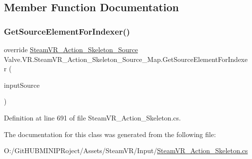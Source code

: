 \subsection{Member Function Documentation}
\mbox{\label{class_valve_1_1_v_r_1_1_steam_v_r___action___skeleton___source___map_a78146d0a428c0c497167e40b6fc4e5bc}} 
\subsubsection{\texorpdfstring{GetSourceElementForIndexer()}{GetSourceElementForIndexer()}}
{\footnotesize\ttfamily override \mbox{\hyperlink{class_valve_1_1_v_r_1_1_steam_v_r___action___skeleton___source}{Steam\+V\+R\+\_\+\+Action\+\_\+\+Skeleton\+\_\+\+Source}} Valve.\+V\+R.\+Steam\+V\+R\+\_\+\+Action\+\_\+\+Skeleton\+\_\+\+Source\+\_\+\+Map.\+Get\+Source\+Element\+For\+Indexer (\begin{DoxyParamCaption}\item[{\mbox{\hyperlink{namespace_valve_1_1_v_r_a82e5bf501cc3aa155444ee3f0662853f}{Steam\+V\+R\+\_\+\+Input\+\_\+\+Sources}}}]{input\+Source }\end{DoxyParamCaption})\hspace{0.3cm}{\ttfamily [protected]}}



Definition at line 691 of file Steam\+V\+R\+\_\+\+Action\+\_\+\+Skeleton.\+cs.



The documentation for this class was generated from the following file\+:\begin{DoxyCompactItemize}
\item 
O\+:/\+Git\+H\+U\+B\+M\+I\+N\+I\+P\+Roject/\+Assets/\+Steam\+V\+R/\+Input/\mbox{\hyperlink{_steam_v_r___action___skeleton_8cs}{Steam\+V\+R\+\_\+\+Action\+\_\+\+Skeleton.\+cs}}\end{DoxyCompactItemize}
